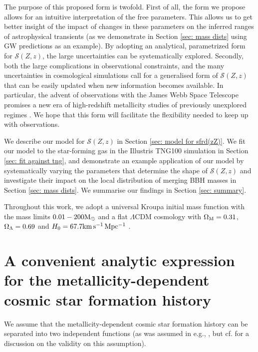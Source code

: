 \documentclass[linenumbers,twocolumn]{aastex631}
\newcommand{\Msun}{\ensuremath{\rm{M}_{\odot}}\xspace}
\newcommand{\SFRDzZ}{\ensuremath{\mathcal{S}(Z,z)}\xspace}
\begin{document}
The purpose of this proposed form is twofold.  
First of all, the form we propose allows for an intuitive interpretation of the free parameters. This allows us to get better insight of the impact of changes in these parameters on the inferred ranges of astrophysical transients (as we demonstrate in Section \ref{sec: mass dists} using GW predictions as an example). By adopting an analytical, parametrized form for \SFRDzZ, the large uncertainties can be systematically explored.
%
Secondly, both the large complications in observational constraints, and the many uncertainties in cosmological simulations call for a generalised form of \SFRDzZ that can be easily updated when new information becomes available. 
In particular, the advent of observations with the James Webb Space Telescope promises a new era of high-redshift
metallicity studies of previously unexplored regimes \citep[e.g.,][]{Sanders+2022}. We hope that this form will facilitate the flexibility needed to keep up with observations. 


We describe our model for \SFRDzZ in Section \ref{sec: model for sfrd(zZ)}.
We fit our model to the star-forming gas in the Illustris TNG100 simulation in Section \ref{sec: fit against tng}, and demonstrate an example application of our model by systematically varying the parameters that determine the shape of \SFRDzZ and investigate their impact on the local distribution of merging BBH masses in Section \ref{sec: mass dists}.
We summarise our findings in Section \ref{sec: summary}.

Throughout this work, we adopt a universal Kroupa initial mass function \citep{Kroupa2001} with the mass
limits $0.01 - 200\Msun$ and a flat $\Lambda$CDM cosmology with $\Omega_{\rm{M}}=0.31$, $\Omega_{\rm{\Lambda}}=0.69$ and $H_0=67.7\rm{km\,s^{-1}\,Mpc^{-1}}$ \citep{Planck18_VI}.


\section{A convenient analytic expression for the metallicity-dependent cosmic star formation history \label{sec: model for sfrd(zZ)} }
We assume that the metallicity-dependent cosmic star formation history can be separated into two independent functions 
(as was assumed in e.g., \citealt{LangerNorman2006}, but cf. \citealt{chruslinska2022_review} for a discussion on the validity on this assumption).
\end{document}
